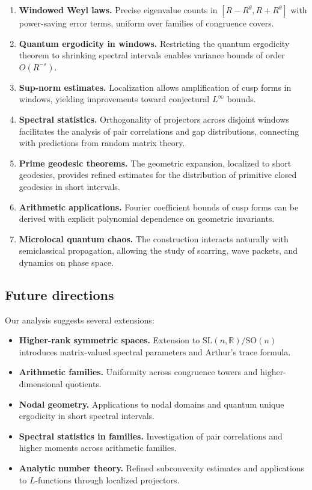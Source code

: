 \begin{enumerate}
  \item \textbf{Windowed Weyl laws.}  
        Precise eigenvalue counts in $[R-R^\theta,R+R^\theta]$ with power-saving error 
        terms, uniform over families of congruence covers.
  \item \textbf{Quantum ergodicity in windows.}  
        Restricting the quantum ergodicity theorem to shrinking spectral intervals 
        enables variance bounds of order $O(R^{-\varepsilon})$.
  \item \textbf{Sup-norm estimates.}  
        Localization allows amplification of cusp forms in windows, yielding 
        improvements toward conjectural $L^\infty$ bounds.
  \item \textbf{Spectral statistics.}  
        Orthogonality of projectors across disjoint windows facilitates the analysis of 
        pair correlations and gap distributions, connecting with predictions from random 
        matrix theory.
  \item \textbf{Prime geodesic theorems.}  
        The geometric expansion, localized to short geodesics, provides refined estimates 
        for the distribution of primitive closed geodesics in short intervals.
  \item \textbf{Arithmetic applications.}  
        Fourier coefficient bounds of cusp forms can be derived with explicit polynomial 
        dependence on geometric invariants.
  \item \textbf{Microlocal quantum chaos.}  
        The construction interacts naturally with semiclassical propagation, allowing the 
        study of scarring, wave packets, and dynamics on phase space.
\end{enumerate}

\subsection{Future directions}\label{subsec:future}

Our analysis suggests several extensions:

\begin{itemize}
  \item \textbf{Higher-rank symmetric spaces.}  
        Extension to $\mathrm{SL}(n,\mathbb{R})/\mathrm{SO}(n)$ introduces 
        matrix-valued spectral parameters and Arthur’s trace formula.
  \item \textbf{Arithmetic families.}  
        Uniformity across congruence towers and higher-dimensional quotients.
  \item \textbf{Nodal geometry.}  
        Applications to nodal domains and quantum unique ergodicity in short spectral 
        intervals.
  \item \textbf{Spectral statistics in families.}  
        Investigation of pair correlations and higher moments across arithmetic families.
  \item \textbf{Analytic number theory.}  
        Refined subconvexity estimates and applications to $L$-functions through localized 
        projectors.
\end{itemize}

